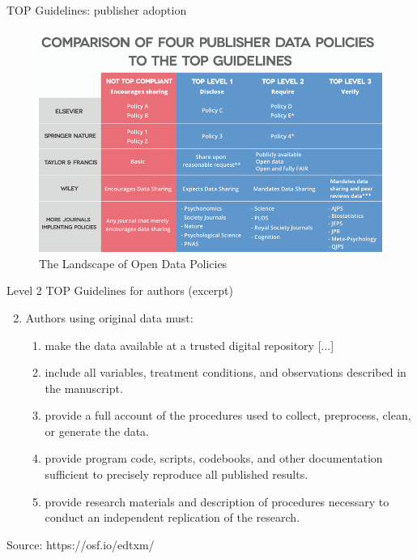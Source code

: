 \documentclass[aspectratio=169, 12pt]{beamer} %
\begin{document}
\begin{frame}{TOP Guidelines: publisher adoption}
  \begin{figure}[H]
    \centering
        \includegraphics[height=.7\textheight]{figures/TOP-landscape.png}
        \caption{The Landscape of Open Data Policies \cite{Mellor2018-bf}}
        \label{fig:figure2}
  \end{figure}
\end{frame}


\begin{frame}{Level 2 TOP Guidelines for authors (excerpt)}
  
    \begin{enumerate}[label=\arabic*.]
        \setcounter{enumi}{1}
        
        \item Authors using original data must:
        \begin{enumerate}[label=\alph*.]

            \item make the data available at a trusted digital repository [...]
            \item include all variables, treatment conditions, and observations described in the manuscript.
            \item provide a full account of the procedures used to collect, preprocess, clean, or generate the data.
            \item provide program code, scripts, codebooks, and other documentation sufficient to precisely reproduce all published results.
            \item provide research materials and description of procedures necessary to conduct an independent replication of the research.
        \end{enumerate}
    \end{enumerate}
    Source: https://osf.io/edtxm/
\end{frame}
\end{document}
